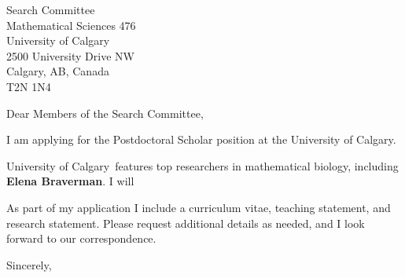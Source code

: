 \documentclass[11pt,a4paper]{letter}
\begin{document}

\def\School{University of Calgary}

\begin{letter}
{Search Committee\\
Mathematical Sciences 476\\
University of Calgary\\
2500 University Drive NW\\
Calgary, AB, Canada\\
T2N 1N4
}


\opening{Dear Members of the Search Committee,}

I am applying for the Postdoctoral Scholar position at the \School. 



\School~features top researchers in mathematical biology, including \textbf{Elena Braverman}. I will 



As part of my application I include a curriculum vitae, teaching statement, and research statement. Please request additional details as needed, and I look forward to our correspondence.

\closing{Sincerely,}
\end{letter}
\end{document}
